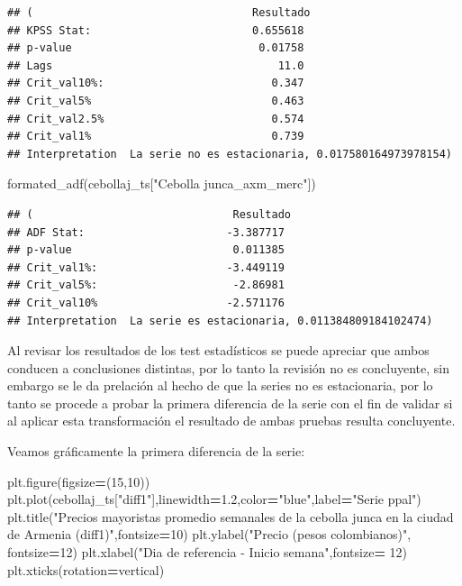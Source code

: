 \documentclass[
]{book}
\newenvironment{Shaded}{\begin{snugshade}}{\end{snugshade}}
\newcommand{\DecValTok}[1]{\textcolor[rgb]{0.00,0.00,0.81}{#1}}
\newcommand{\FloatTok}[1]{\textcolor[rgb]{0.00,0.00,0.81}{#1}}
\newcommand{\NormalTok}[1]{#1}
\newcommand{\OperatorTok}[1]{\textcolor[rgb]{0.81,0.36,0.00}{\textbf{#1}}}
\newcommand{\StringTok}[1]{\textcolor[rgb]{0.31,0.60,0.02}{#1}}
\begin{document}
\begin{verbatim}
## (                                  Resultado
## KPSS Stat:                         0.655618
## p-value                             0.01758
## Lags                                   11.0
## Crit_val10%:                          0.347
## Crit_val5%                            0.463
## Crit_val2.5%                          0.574
## Crit_val1%                            0.739
## Interpretation  La serie no es estacionaria, 0.017580164973978154)
\end{verbatim}

\begin{Shaded}
\begin{Highlighting}[]
\NormalTok{formated\_adf(cebollaj\_ts[}\StringTok{"Cebolla junca\_axm\_merc"}\NormalTok{])}
\end{Highlighting}
\end{Shaded}

\begin{verbatim}
## (                               Resultado
## ADF Stat:                      -3.387717
## p-value                         0.011385
## Crit_val1%:                    -3.449119
## Crit_val5%:                     -2.86981
## Crit_val10%                    -2.571176
## Interpretation  La serie es estacionaria, 0.011384809184102474)
\end{verbatim}

Al revisar los resultados de los test estadísticos se puede apreciar que ambos conducen a conclusiones distintas, por lo tanto la revisión no es concluyente, sin embargo se le da prelación al hecho de que la series no es estacionaria, por lo tanto se procede a probar la primera diferencia de la serie con el fin de validar si al aplicar esta transformación el resultado de ambas pruebas resulta concluyente.

Veamos gráficamente la primera diferencia de la serie:

\begin{Shaded}
\begin{Highlighting}[]


\NormalTok{plt.figure(figsize}\OperatorTok{=}\NormalTok{(}\DecValTok{15}\NormalTok{,}\DecValTok{10}\NormalTok{))}
\NormalTok{plt.plot(cebollaj\_ts[}\StringTok{"diff1"}\NormalTok{],linewidth}\OperatorTok{=}\FloatTok{1.2}\NormalTok{,color}\OperatorTok{=}\StringTok{"blue"}\NormalTok{,label}\OperatorTok{=}\StringTok{"Serie ppal"}\NormalTok{)}
\NormalTok{plt.title(}\StringTok{"Precios mayoristas promedio semanales de la cebolla junca en la ciudad de Armenia (diff1)"}\NormalTok{,fontsize}\OperatorTok{=}\DecValTok{10}\NormalTok{)}
\NormalTok{plt.ylabel(}\StringTok{"Precio (pesos colombianos)"}\NormalTok{, fontsize}\OperatorTok{=}\DecValTok{12}\NormalTok{)}
\NormalTok{plt.xlabel(}\StringTok{"Dia de referencia {-} Inicio semana"}\NormalTok{,fontsize}\OperatorTok{=} \DecValTok{12}\NormalTok{)}
\NormalTok{plt.xticks(rotation}\OperatorTok{=}\StringTok{\textquotesingle{}vertical\textquotesingle{}}\NormalTok{)}
\end{Highlighting}
\end{Shaded}
\end{document}
